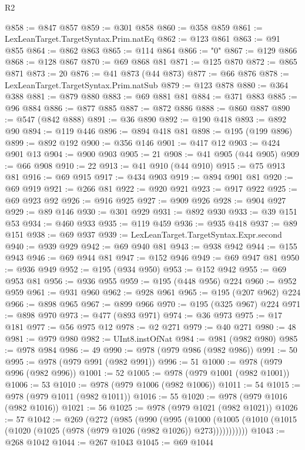 \begin{lexlean}{R2}
\begin{coremodule}
{{{{{{{{{{{{{{{{{{{{{{{{{{{{{{{{{{{{{{{{{{{{{{@858 := @847 @857
@859 := @301 @858
@860 := @358 @859
@861 := LexLeanTarget.TargetSyntax.Prim.natEq
@862 := @123 @861
@863 := @91 @855
@864 := @862 @863
@865 := @114 @864
@866 := "0"
@867 := @129 @866
@868 := @128 @867
@870 := @69 @868 @81
@871 := @125 @870
@872 := @865 @871
@873 := 20
@876 := @41 @873 (@44 @873)
@877 := @66 @876
@878 := LexLeanTarget.TargetSyntax.Prim.natSub
@879 := @123 @878
@880 := @364 @388
@881 := @879 @880
@883 := @69 @881 @81
@884 := @371 @883
@885 := @96 @884
@886 := @877 @885
@887 := @872 @886
@888 := @860 @887
@890 := @547 (@842 @888)
@891 := @36 @890
@892 := @190 @418
@893 := @892 @90
@894 := @119 @446
@896 := @894 @418 @81
@898 := @195 (@199 @896)
@899 := @892 @192
@900 := @356 @146
@901 := @417 @12
@903 := @424 @901 @13
@904 := @900 @903
@905 := 21
@908 := @41 @905 (@44 @905)
@909 := @66 @908
@910 := 22
@913 := @41 @910 (@44 @910)
@915 := @75 @913 @81
@916 := @69 @915
@917 := @434 @903
@919 := @894 @901 @81
@920 := @69 @919
@921 := @266 @81
@922 := @920 @921
@923 := @917 @922
@925 := @69 @923 @92
@926 := @916 @925
@927 := @909 @926
@928 := @904 @927
@929 := @89 @146
@930 := @301 @929
@931 := @892 @930
@933 := @39 @151 @53
@934 := @460 @933
@935 := @119 @459
@936 := @935 @418
@937 := @89 @151
@938 := @69 @937
@939 := LexLeanTarget.TargetSyntax.Expr.second
@940 := @939 @929
@942 := @69 @940 @81
@943 := @938 @942
@944 := @155 @943
@946 := @69 @944 @81
@947 := @152 @946
@949 := @69 @947 @81
@950 := @936 @949
@952 := @195 (@934 @950)
@953 := @152 @942
@955 := @69 @953 @81
@956 := @936 @955
@959 := @195 (@448 @956) @224
@960 := @952 @959
@961 := @931 @960
@962 := @928 @961
@965 := @195 (@207 @962) @224
@966 := @898 @965
@967 := @899 @966
@970 := @195 (@325 @967) @224
@971 := @898 @970
@973 := @477 (@893 @971)
@974 := @36 @973
@975 := @17 @181
@977 := @56 @975 @12
@978 := @2 @271
@979 := @40 @271
@980 := 48
@981 := @979 @980
@982 := UInt8.instOfNat
@984 := @981 (@982 @980)
@985 := @978 @984
@986 := 49
@990 := @978 (@979 @986 (@982 @986))
@991 := 50
@995 := @978 (@979 @991 (@982 @991))
@996 := 51
@1000 := @978 (@979 @996 (@982 @996))
@1001 := 52
@1005 := @978 (@979 @1001 (@982 @1001))
@1006 := 53
@1010 := @978 (@979 @1006 (@982 @1006))
@1011 := 54
@1015 := @978 (@979 @1011 (@982 @1011))
@1016 := 55
@1020 := @978 (@979 @1016 (@982 @1016))
@1021 := 56
@1025 := @978 (@979 @1021 (@982 @1021))
@1026 := 57
@1042 := @269
    (@272
      (@985
        (@990
          (@995
            (@1000
              (@1005 (@1010 (@1015 (@1020 (@1025 (@978 (@979 @1026 (@982 @1026)) @273)))))))))))
@1043 := @268 @1042
@1044 := @267 @1043
@1045 := @69 @1044
}}}}}}}}}}}}}}}}}}}}}}}}}}}}}}}}}}}}}}}}}}}}}}
\end{coremodule}
\end{lexlean}
